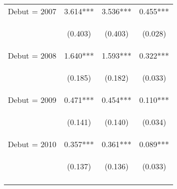 \documentclass{article} %
\begin{document}
\begin{table}[H]
\begin{center}
\begin{tabular}{lccc}
Debut = 2007 & 3.614*** & 3.536*** & 0.455*** \\
\vspace{4pt} & \begin{footnotesize}(0.403)\end{footnotesize} & \begin{footnotesize}(0.403)\end{footnotesize} & \begin{footnotesize}(0.028)\end{footnotesize} \\
Debut = 2008 & 1.640*** & 1.593*** & 0.322*** \\
\vspace{4pt} & \begin{footnotesize}(0.185)\end{footnotesize} & \begin{footnotesize}(0.182)\end{footnotesize} & \begin{footnotesize}(0.033)\end{footnotesize} \\
Debut = 2009 & 0.471*** & 0.454*** & 0.110*** \\
\vspace{4pt} & \begin{footnotesize}(0.141)\end{footnotesize} & \begin{footnotesize}(0.140)\end{footnotesize} & \begin{footnotesize}(0.034)\end{footnotesize} \\
Debut = 2010 & 0.357*** & 0.361*** & 0.089*** \\
\vspace{4pt} & \begin{footnotesize}(0.137)\end{footnotesize} & \begin{footnotesize}(0.136)\end{footnotesize} & \begin{footnotesize}(0.033)\end{footnotesize} \\
\vspace{4pt} & \begin{footnotesize}\end{footnotesize} & \begin{footnotesize}\end{footnotesize} & \begin{footnotesize}\end{footnotesize} \\

\end{tabular}
\end{center}
\end{table}
\end{document}
